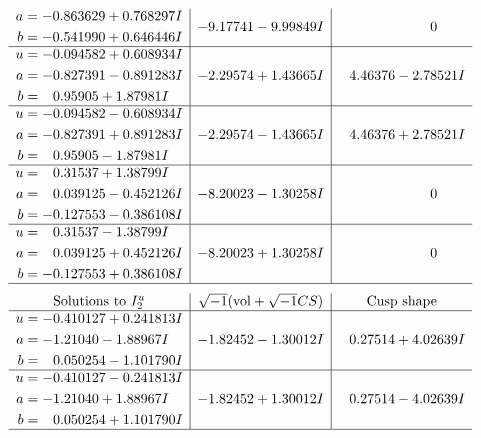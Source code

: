 \documentclass[1p]{elsarticle_modified}
\theoremstyle{definition}
\newcommand{\I}{\sqrt{-1}}
\begin{document}
$$\begin{array}{c|c|c}
\begin{aligned}
a &= -0.863629 + 0.768297 I \\
b &= -0.541990 + 0.646446 I\end{aligned}
 & -9.17741 - 9.99849 I & \phantom{-0.000000 } 0 \\ \hline\begin{aligned}
u &= -0.094582 + 0.608934 I \\
a &= -0.827391 - 0.891283 I \\
b &= \phantom{-}0.95905 + 1.87981 I\end{aligned}
 & -2.29574 + 1.43665 I & \phantom{-}4.46376 - 2.78521 I \\ \hline\begin{aligned}
u &= -0.094582 - 0.608934 I \\
a &= -0.827391 + 0.891283 I \\
b &= \phantom{-}0.95905 - 1.87981 I\end{aligned}
 & -2.29574 - 1.43665 I & \phantom{-}4.46376 + 2.78521 I \\ \hline\begin{aligned}
u &= \phantom{-}0.31537 + 1.38799 I \\
a &= \phantom{-}0.039125 - 0.452126 I \\
b &= -0.127553 - 0.386108 I\end{aligned}
 & -8.20023 - 1.30258 I & \phantom{-0.000000 } 0 \\ \hline\begin{aligned}
u &= \phantom{-}0.31537 - 1.38799 I \\
a &= \phantom{-}0.039125 + 0.452126 I \\
b &= -0.127553 + 0.386108 I\end{aligned}
 & -8.20023 + 1.30258 I & \phantom{-0.000000 } 0\\
 \hline 
 \end{array}$$\newpage$$\begin{array}{c|c|c}  
\text{Solutions to }I^u_{2}& \I (\text{vol} + \sqrt{-1}CS) & \text{Cusp shape}\\
 \hline 
\begin{aligned}
u &= -0.410127 + 0.241813 I \\
a &= -1.21040 - 1.88967 I \\
b &= \phantom{-}0.050254 - 1.101790 I\end{aligned}
 & -1.82452 - 1.30012 I & \phantom{-}0.27514 + 4.02639 I \\ \hline\begin{aligned}
u &= -0.410127 - 0.241813 I \\
a &= -1.21040 + 1.88967 I \\
b &= \phantom{-}0.050254 + 1.101790 I\end{aligned}
 & -1.82452 + 1.30012 I & \phantom{-}0.27514 - 4.02639 I\\
 \hline 
 \end{array}$$\newpage\newpage\renewcommand{\arraystretch}{1}
\end{document}

